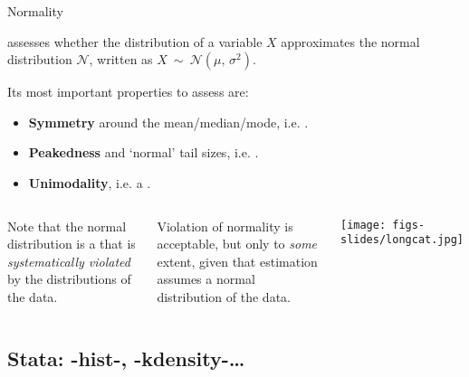 \documentclass{beamer}
\begin{document}
	\begin{frame}[t]{Normality}

	 assesses whether the distribution of a variable $X$ approximates the normal distribution $\mathcal{N}$, written as $X\ \sim\ \mathcal{N}(\mu,\,\sigma^2)$.\vspace{1em}
	
	Its most important properties to assess are:

		\begin{itemize}
			\item \textbf{Symmetry} around the mean/median/mode,
			i.e. .
		
			\item \textbf{Peakedness} and `normal' tail sizes,
			i.e. .

			\item \textbf{Unimodality}, 
			i.e. a .
		\end{itemize}
		
	\begin{columns}[T]
	Note that the normal distribution is a  that is \textit{systematically violated} by the distributions of the data.\vspace{1em}
	
	Violation of normality is acceptable, but only to \textit{some} extent, given that estimation assumes a normal distribution of the data.
		\vspace{-3em}
		\begin{flushright}
		\texttt{[image: figs-slides/longcat.jpg]}		
		\end{flushright}
	\end{columns}
	
	\end{frame}
	
	\subsection{Stata: -hist-, -kdensity-…}
\end{document}
